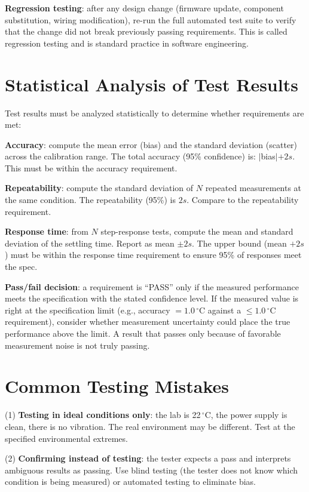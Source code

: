 \documentclass[11pt,letterpaper,twoside,openany]{book}
\newcommand{\degC}{\ensuremath{{}^{\circ}\text{C}}}
\begin{document}
\textbf{Regression testing}: after any design change (firmware update, component substitution, wiring modification), re-run the full automated test suite to verify that the change did not break previously passing requirements. This is called regression testing and is standard practice in software engineering.

\section{Statistical Analysis of Test Results}
Test results must be analyzed statistically to determine whether requirements are met:

\textbf{Accuracy}: compute the mean error (bias) and the standard deviation (scatter) across the calibration range. The total accuracy (95\% confidence) is: $|$bias$| + 2s$. This must be within the accuracy requirement.

\textbf{Repeatability}: compute the standard deviation of $N$ repeated measurements at the same condition. The repeatability (95\%) is $2s$. Compare to the repeatability requirement.

\textbf{Response time}: from $N$ step-response tests, compute the mean and standard deviation of the settling time. Report as mean $\pm 2s$. The upper bound (mean $+ 2s$) must be within the response time requirement to ensure 95\% of responses meet the spec.

\textbf{Pass/fail decision}: a requirement is ``PASS'' only if the measured performance meets the specification with the stated confidence level. If the measured value is right at the specification limit (e.g., accuracy $= 1.0$\,\degC{} against a $\leq 1.0$\,\degC{} requirement), consider whether measurement uncertainty could place the true performance above the limit. A result that passes only because of favorable measurement noise is not truly passing.

\section{Common Testing Mistakes}
(1) \textbf{Testing in ideal conditions only}: the lab is 22\,\degC{}, the power supply is clean, there is no vibration. The real environment may be different. Test at the specified environmental extremes.

(2) \textbf{Confirming instead of testing}: the tester expects a pass and interprets ambiguous results as passing. Use blind testing (the tester does not know which condition is being measured) or automated testing to eliminate bias.
\end{document}
